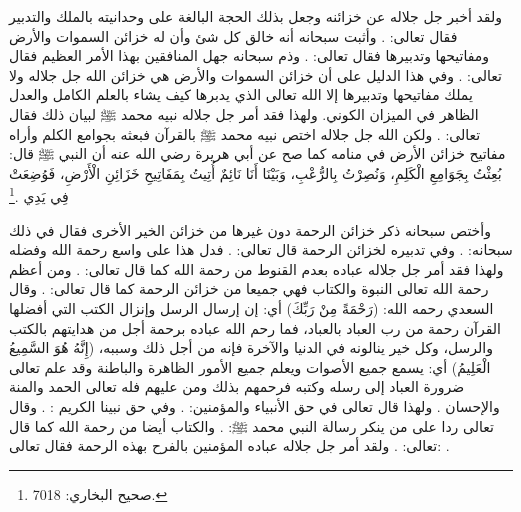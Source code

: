 ولقد أخبر جل جلاله عن خزائنه وجعل بذلك الحجة البالغة على وحدانيته بالملك والتدبير فقال تعالى: 
\quranayah*[52][37]{\footnotesize \surahname*[52]}. وأثبت سبحانه أنه خالق كل شئ وأن له خزائن السموات والأرض ومفاتيحها وتدبيرها فقال تعالى: 
\quranayah*[39][62-63]{\footnotesize \surahname*[39]}. وذم سبحانه جهل المنافقين بهذا الأمر العظيم فقال تعالى: \quranayah*[63][7][13]{\footnotesize \surahname*[63]}. وفي هذا الدليل على أن خزائن السموات والأرض هي خزائن الله جل جلاله ولا يملك مفاتيحها وتدبيرها إلا الله تعالى الذي يدبرها كيف يشاء بالعلم الكامل والعدل الظاهر في الميزان الكوني. ولهذا فقد أمر جل جلاله نبيه محمد ﷺ لبيان ذلك فقال تعالى: \quranayah*[6][50]{\footnotesize \surahname*[6]}. ولكن الله جل جلاله اختص نبيه محمد ﷺ بالقرآن فبعثه بجوامع الكلم وأراه مفاتيح خزائن الأرض في منامه كما صح عن أبي هريرة رضي الله عنه أن النبي ﷺ قال: بُعِثْتُ بِجَوَامِعِ الْكَلِمِ، وَنُصِرْتُ بِالرُّعْبِ، وَبَيْنَا أَنَا نَائِمٌ أُتِيتُ بِمَفَاتِيحِ خَزَائِنِ الْأَرْضِ، فَوُضِعَتْ فِي يَدِي \href{https://shamela.ws/book/1284/4398#p2}{\faExternalLink} \cite{bukhari}.\footnote{صحيح البخاري: 7018.} 

وأختص سبحانه ذكر خزائن الرحمة دون غيرها من خزائن الخير الأخرى فقال في ذلك سبحانه: 
\quranayah*[38][9]{\footnotesize \surahname*[38]}. وفي تدبيره لخزائن الرحمة قال تعالى: 
\quranayah*[17][100]{\footnotesize \surahname*[17]}. فدل هذا على واسع رحمة الله وفضله ولهذا فقد أمر جل جلاله عباده بعدم القنوط من رحمة الله كما قال تعالى: 
\quranayah*[39][53]{\footnotesize \surahname*[39]}. 
ومن أعظم رحمة الله تعالى النبوة والكتاب فهي جميعا من خزائن الرحمة كما قال تعالى: 
\quranayah*[44][6]{\footnotesize \surahname*[44]}. وقال السعدي رحمه الله: (رَحْمَةً مِنْ رَبِّكَ) أي: إن إرسال الرسل وإنزال الكتب التي أفضلها القرآن رحمة من رب العباد بالعباد، فما رحم الله عباده برحمة أجل من هدايتهم بالكتب والرسل، وكل خير ينالونه في الدنيا والآخرة فإنه من أجل ذلك وسببه، (إِنَّهُ هُوَ السَّمِيعُ الْعَلِيمُ) أي: يسمع جميع الأصوات ويعلم جميع الأمور الظاهرة والباطنة وقد علم تعالى ضرورة العباد إلى رسله وكتبه فرحمهم بذلك ومن عليهم فله تعالى الحمد والمنة والإحسان \href{https://shamela.ws/book/42/1753#p4}{\faExternalLink} \cite{tafsir_Saadi}.
ولهذا قال تعالى في حق الأنبياء والمؤمنين: 
\quranayah*[3][74]{\footnotesize \surahname*[3]}.
وفي حق نبينا الكريم : 
\quranayah*[21][107]{\footnotesize \surahname*[21]}.  وقال تعالى ردا على من ينكر رسالة النبي محمد ﷺ: \quranayah*[43][32]{\footnotesize \surahname*[43]}. والكتاب أيضا من رحمة الله كما قال تعالى: 
\quranayah*[31][2-3]{\footnotesize \surahname*[31]}. ولقد أمر جل جلاله عباده المؤمنين بالفرح بهذه الرحمة فقال تعالى: 
\quranayah*[10][57-58]{\footnotesize \surahname*[10]}.

